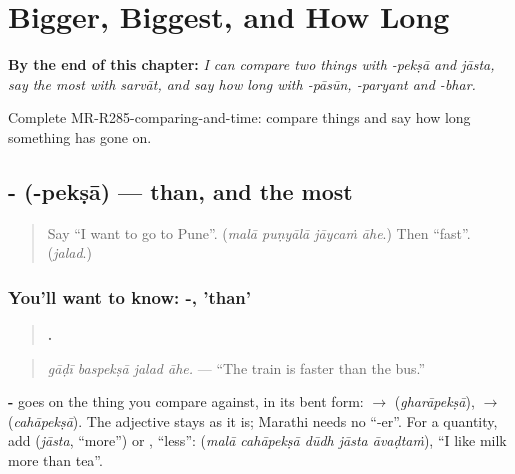 
\chapter{Bigger, Biggest, and How Long}
\label{ch:mr-bigger-biggest-and-how-long}

\begin{chapteropening}
\textbf{By the end of this chapter:} \emph{I can compare two things with -pekṣā and jāsta, say the most with sarvāt, and say how long with -pāsūn, -paryant and -bhar.}

Complete MR-R285-comparing-and-time: compare things and say how long something has gone on.
\end{chapteropening}

\section[\texorpdfstring{-\mr{पेक्षा} (-pekṣā)}{-पेक्षा (-pekṣā)}]{- (-pekṣā) — than, and the most}

\label{lesson:MR-C285-peksha}



\begin{quote}
Say \textquotedblleft{}I want to go to Pune\textquotedblright{}. (\emph{malā puṇyālā jāycaṁ āhe}.) Then \textquotedblleft{}fast\textquotedblright{}. (\emph{jalad}.)
\end{quote}

\subsection*{You'll want to know: -, 'than'}
\begin{quote}
\textbf{   .}
\end{quote}

\begin{quote}
\emph{gāḍī baspekṣā jalad āhe.} — \textquotedblleft{}The train is faster than the bus.\textquotedblright{}
\end{quote}

\textbf{-} goes on the thing you compare against, in its bent form: \textbf{} $\to$ \textbf{} (\emph{gharāpekṣā}), \textbf{} $\to$ \textbf{} (\emph{cahāpekṣā}). The adjective stays as it is; Marathi needs no \textquotedblleft{}-er\textquotedblright{}. For a quantity, add \textbf{} (\emph{jāsta}, \textquotedblleft{}more\textquotedblright{}) or \textbf{}, \textquotedblleft{}less\textquotedblright{}: \textbf{    } (\emph{malā cahāpekṣā dūdh jāsta āvaḍtaṁ}), \textquotedblleft{}I like milk more than tea\textquotedblright{}.

